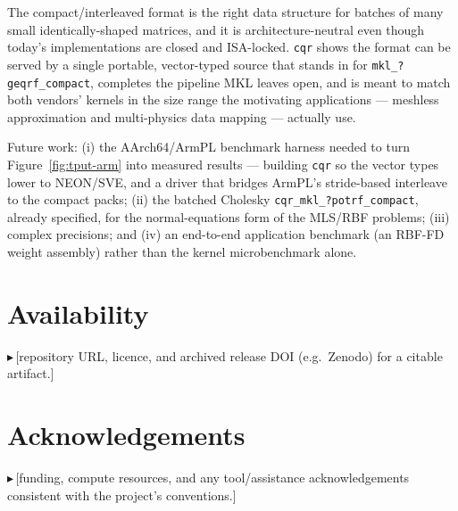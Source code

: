 \documentclass[11pt]{article}
\newif\ifdraftmode \draftmodetrue
\newcommand{\draftnote}[1]{\ifdraftmode{\textcolor{orange!85!black}{\small$\blacktriangleright$\,\textsf{[#1]}}}\fi}
\newcommand{\code}[1]{\texttt{#1}}
\newcommand{\cqr}{\mbox{\texttt{cqr}}}
\begin{document}
The compact/interleaved format is the right data structure for batches of many
small identically-shaped matrices, and it is architecture-neutral even though
today's implementations are closed and ISA-locked. \cqr{} shows the format can be
served by a single portable, vector-typed source that stands in for
\code{mkl\_?geqrf\_compact}, completes the pipeline MKL leaves open, and is meant
to match both vendors' kernels in the size range the motivating applications ---
meshless approximation and multi-physics data mapping --- actually use.

Future work: (i) the AArch64/ArmPL benchmark harness needed to turn
Figure~\ref{fig:tput-arm} into measured results --- building \cqr{} so the vector
types lower to NEON/SVE, and a driver that bridges ArmPL's stride-based
interleave to the compact packs; (ii) the batched Cholesky
\code{cqr\_mkl\_?potrf\_compact}, already specified, for the normal-equations form
of the MLS/RBF problems; (iii) complex precisions; and (iv) an end-to-end
application benchmark (an RBF-FD weight assembly) rather than the kernel
microbenchmark alone.

\section*{Availability}
\draftnote{repository URL, licence, and archived release DOI (e.g.\ Zenodo) for a
citable artifact.}

\section*{Acknowledgements}
\draftnote{funding, compute resources, and any tool/assistance acknowledgements
consistent with the project's conventions.}



\end{document}
